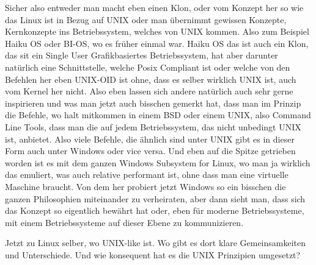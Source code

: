 \begin{description}
\NH Sicher also entweder man macht eben einen Klon, oder vom Konzept her so wie das Linux ist in Bezug auf UNIX oder man übernimmt gewissen Konzepte, Kernkonzepte ins Betriebssystem, welches von UNIX kommen. Also zum Beispiel Haiku OS oder BI-OS, wo es früher einmal war. Haiku OS das ist auch ein Klon, das sit ein Single User Grafikbasiertes Betriebssystem, hat aber darunter natürlich eine Schnittstelle, welche Posix Compliant ist oder welche von den Befehlen her eben UNIX-OID ist ohne, dass es selber wirklich UNIX ist, auch vom Kernel her nicht. Also eben lassen sich andere natürlich auch sehr gerne inspirieren und was man jetzt auch bisschen gemerkt hat, dass man im Prinzip die Befehle, wo halt mitkommen in einem BSD oder einem UNIX, also Command Line Tools, dass man die auf jedem Betriebssystem, das nicht unbedingt UNIX ist, anbietet. Also viele Befehle, die ähnlich sind unter UNIX gibt es in dieser Form auch unter Windows oder vice versa. Und eben auf die Spitze getrieben worden ist es mit dem ganzen Windows Subsystem for Linux, wo man ja wirklich das emuliert, was auch relative performant ist, ohne dass man eine virtuelle Maschine braucht. Von dem her probiert jetzt Windows so ein bisschen die ganzen Philosophien miteinander zu verheiraten, aber dann sieht man, dass sich das Konzept so eigentlich bewährt hat oder, eben für moderne Betriebssysteme, mit einem Betriebssysteme auf dieser Ebene zu kommunizieren.
	
\DS Jetzt zu Linux selber, wo UNIX-like ist. Wo gibt es dort klare Gemeinsamkeiten und Unterschiede. Und wie konsequent hat es die UNIX Prinzipien umgesetzt?


\end{description}
